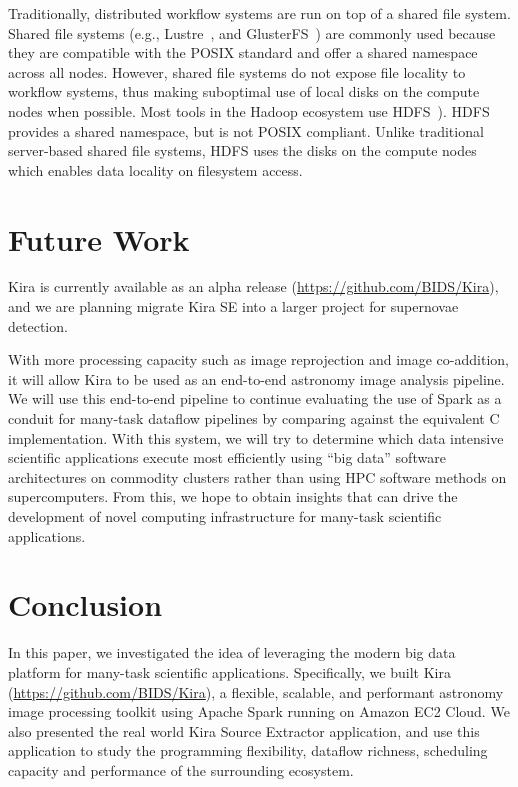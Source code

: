 \documentclass[10pt,journal,compsoc]{IEEEtran}
\begin{document}
Traditionally, distributed workflow systems are run on top of a shared file system. 
Shared file systems (e.g., Lustre~\cite{donovan03}, and
GlusterFS~\cite{davies13}) are commonly used because they are compatible with the POSIX
standard and offer a shared namespace across all nodes. However, shared file systems
do not expose file locality to workflow systems, thus making suboptimal use of local
disks on the compute nodes when possible. Most tools in the Hadoop ecosystem use
HDFS~\cite{shvachko10}). HDFS  provides a shared namespace, but is not POSIX
compliant. Unlike traditional server-based shared file systems, HDFS uses
the disks on the compute nodes which enables data locality on filesystem access.

\section{Future Work}
\label{sec:Future}
Kira is currently available as an alpha release (\url{https://github.com/BIDS/Kira}), 
and we are planning migrate Kira SE into a larger project for supernovae detection.

With more processing capacity such as image reprojection and image co-addition, it will allow Kira to be
used as an end-to-end astronomy image analysis pipeline. We will use this end-to-end pipeline
to continue evaluating the use of Spark as a conduit for many-task dataflow pipelines by
comparing against the equivalent C implementation. With this system, we will try to determine
which data intensive scientific applications execute most efficiently using ``big data''
software architectures on commodity clusters rather than using HPC software methods on supercomputers.
From this, we hope to obtain insights that can drive the development of novel computing
infrastructure for many-task scientific applications.



\section{Conclusion}
\label{sec:Conclusion}

In this paper, we investigated the idea of leveraging the modern big data platform for many-task
scientific applications. Specifically, we built Kira (\url{https://github.com/BIDS/Kira}), a flexible, scalable,
and performant astronomy image processing toolkit using Apache Spark running on Amazon EC2 Cloud. We also presented
the real world Kira Source Extractor application, and use this application to study the programming
flexibility, dataflow richness, scheduling capacity and performance of the surrounding ecosystem.
\end{document}
